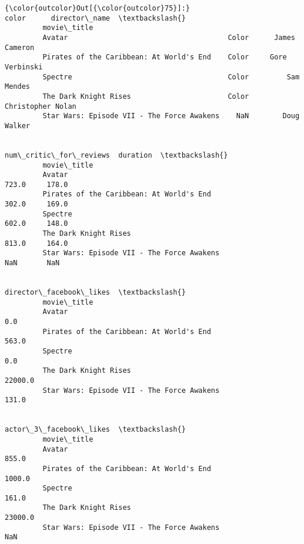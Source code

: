 \documentclass[11pt]{article}
\begin{document}
\begin{Verbatim}[commandchars=\\\{\}]
{\color{outcolor}Out[{\color{outcolor}75}]:}                                             color      director\_name  \textbackslash{}
         movie\_title                                                            
         Avatar                                      Color      James Cameron   
         Pirates of the Caribbean: At World's End    Color     Gore Verbinski   
         Spectre                                     Color         Sam Mendes   
         The Dark Knight Rises                       Color  Christopher Nolan   
         Star Wars: Episode VII - The Force Awakens    NaN        Doug Walker   
         
                                                     num\_critic\_for\_reviews  duration  \textbackslash{}
         movie\_title                                                                    
         Avatar                                                       723.0     178.0   
         Pirates of the Caribbean: At World's End                     302.0     169.0   
         Spectre                                                      602.0     148.0   
         The Dark Knight Rises                                        813.0     164.0   
         Star Wars: Episode VII - The Force Awakens                     NaN       NaN   
         
                                                     director\_facebook\_likes  \textbackslash{}
         movie\_title                                                           
         Avatar                                                          0.0   
         Pirates of the Caribbean: At World's End                      563.0   
         Spectre                                                         0.0   
         The Dark Knight Rises                                       22000.0   
         Star Wars: Episode VII - The Force Awakens                    131.0   
         
                                                     actor\_3\_facebook\_likes  \textbackslash{}
         movie\_title                                                          
         Avatar                                                       855.0   
         Pirates of the Caribbean: At World's End                    1000.0   
         Spectre                                                      161.0   
         The Dark Knight Rises                                      23000.0   
         Star Wars: Episode VII - The Force Awakens                     NaN   
         

\end{Verbatim}
\end{document}

